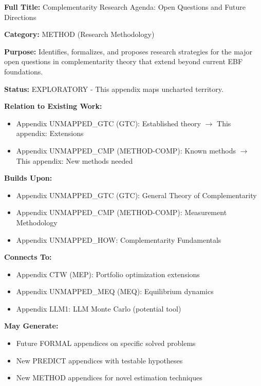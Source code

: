 \begin{tcolorbox}[colback=purple!5!white,colframe=purple!75!black,title=\textbf{Appendix UNMAPPED_RSH: METHOD-RESEARCH}]
\textbf{Full Title:} Complementarity Research Agenda: Open Questions and Future Directions

\textbf{Category:} METHOD (Research Methodology)

\textbf{Purpose:} Identifies, formalizes, and proposes research strategies for the major open questions in complementarity theory that extend beyond current EBF foundations.

\textbf{Status:} EXPLORATORY - This appendix maps uncharted territory.

\textbf{Relation to Existing Work:}
\begin{itemize}[noitemsep]
    \item Appendix UNMAPPED_GTC (GTC): Established theory $\to$ This appendix: Extensions
    \item Appendix UNMAPPED_CMP (METHOD-COMP): Known methods $\to$ This appendix: New methods needed
\end{itemize}
\end{tcolorbox}

\begin{tcolorbox}[colback=gray!5!white,colframe=gray!75!black,title=\textbf{Cross-Reference Map}]
\small
\textbf{Builds Upon:}
\begin{itemize}[noitemsep]
    \item Appendix UNMAPPED_GTC (GTC): General Theory of Complementarity
    \item Appendix UNMAPPED_CMP (METHOD-COMP): Measurement Methodology
    \item Appendix UNMAPPED_HOW: Complementarity Fundamentals
\end{itemize}

\textbf{Connects To:}
\begin{itemize}[noitemsep]
    \item Appendix CTW (MEP): Portfolio optimization extensions
    \item Appendix UNMAPPED_MEQ (MEQ): Equilibrium dynamics
    \item Appendix LLM1: LLM Monte Carlo (potential tool)
\end{itemize}

\textbf{May Generate:}
\begin{itemize}[noitemsep]
    \item Future FORMAL appendices on specific solved problems
    \item New PREDICT appendices with testable hypotheses
    \item New METHOD appendices for novel estimation techniques
\end{itemize}
\end{tcolorbox}

